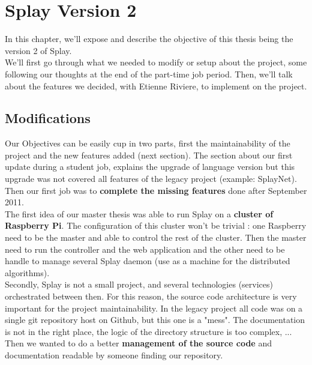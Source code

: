 \documentclass{eplmastersthesis}
\begin{document}
  \chapter{Splay Version 2}

    In this chapter, we'll expose and describe the objective of this thesis
    being the version 2 of Splay.\\

    We'll first go through what we needed to modify or setup about the project,
    some following our thoughts at the end of the part-time job period.
    Then, we'll talk about the features we decided, with Etienne Riviere, to
    implement on the project.

    \section{Modifications} %

      Our Objectives can be easily cup in two parts, first the maintainability
      of the project and the new features added (next section). The section
      about our first update during a student job, explains the upgrade of
      language version but this upgrade was not covered all features of the
      legacy project (example: SplayNet). Then our first job was to
      \textbf{complete the missing features} done after  September 2011.\\

      The first idea of our master thesis was able to run Splay on a
      \textbf{cluster of Raspberry Pi}. The configuration of this cluster won't
      be trivial : one Raspberry need to be the master and able to control the
      rest of the cluster. Then the master need to run the controller and the
      web application and the other need to be handle to manage several Splay
      daemon (use as a machine for the distributed algorithms). \\

      Secondly, Splay is not a small project, and several technologies
      (services) orchestrated between then. For this reason, the source code
      architecture is very important for the project maintainability. In the
      legacy project all code was on a single git repository host on Github,
      but this one is a "mess". The documentation is not in the right place,
      the logic of the directory structure is too complex, ... Then we wanted
      to do a better \textbf{management of the source code} and documentation
      readable by someone finding our repository. \\
\end{document}
